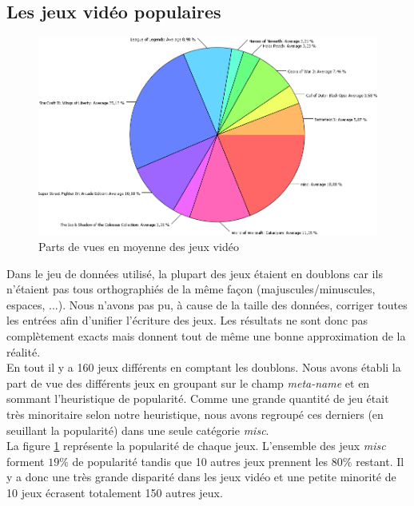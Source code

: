 \documentclass[11pt, a4paper, titlepage]{scrartcl}
\begin{document}
\subsection{Les jeux vidéo populaires}
\begin{figure}[h]
    \centering
    \includegraphics[scale=0.4]{images/main_games}
    \caption{\label{fig:main_games} Parts de vues en moyenne des jeux vidéo}
\end{figure}

Dans le jeu de données utilisé, la plupart des jeux étaient en doublons car ils
n'étaient pas tous orthographiés de la même façon (majuscules/minuscules,
espaces, ...). Nous n'avons pas pu, à cause de la taille des données, corriger
toutes les entrées afin d'unifier l'écriture des jeux. Les résultats ne sont
donc pas complètement exacts mais donnent tout de même une bonne approximation
de la réalité. \\

En tout il y a 160 jeux différents en comptant les doublons. Nous avons établi
la part de vue des différents jeux en groupant sur le champ \textit{meta-name}
et en sommant l'heuristique de popularité. Comme une grande quantité de jeu
était très minoritaire selon notre heuristique, nous avons regroupé ces
derniers (en seuillant la popularité) dans une seule catégorie \textit{misc}. \\

La figure \ref{fig:main_games} représente la popularité de chaque jeux.
L'ensemble des jeux \textit{misc} forment $19\%$ de popularité tandis que 10
autres jeux prennent les $80\%$ restant. Il y a donc une très grande disparité
dans les jeux vidéo et une petite minorité de 10 jeux écrasent totalement 150
autres jeux.
\end{document}
